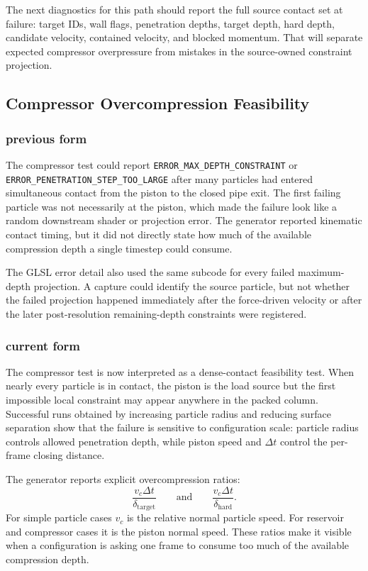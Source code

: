 The next diagnostics for this path should report the full source contact set
at failure: target IDs, wall flags, penetration depths, target depth, hard
depth, candidate velocity, contained velocity, and blocked momentum.  That
will separate expected compressor overpressure from mistakes in the
source-owned constraint projection.

\subsection{Compressor Overcompression Feasibility}

\subsubsection{previous form}

The compressor test could report
\texttt{ERROR\_MAX\_DEPTH\_CONSTRAINT} or
\texttt{ERROR\_PENETRATION\_STEP\_TOO\_LARGE} after many particles had
entered simultaneous contact from the piston to the closed pipe exit.  The
first failing particle was not necessarily at the piston, which made the
failure look like a random downstream shader or projection error.  The
generator reported kinematic contact timing, but it did not directly state
how much of the available compression depth a single timestep could consume.

The GLSL error detail also used the same subcode for every failed
maximum-depth projection.  A capture could identify the source particle, but
not whether the failed projection happened immediately after the force-driven
velocity or after the later post-resolution remaining-depth constraints were
registered.

\subsubsection{current form}

The compressor test is now interpreted as a dense-contact feasibility test.
When nearly every particle is in contact, the piston is the load source but
the first impossible local constraint may appear anywhere in the packed
column.  Successful runs obtained by increasing particle radius and reducing
surface separation show that the failure is sensitive to configuration scale:
particle radius controls allowed penetration depth, while piston speed and
\(\Delta t\) control the per-frame closing distance.

The generator reports explicit overcompression ratios:
\[
    \frac{v_c\Delta t}{\delta_{\mathrm{target}}}
    \qquad\mathrm{and}\qquad
    \frac{v_c\Delta t}{\delta_{\mathrm{hard}}}.
\]
For simple particle cases \(v_c\) is the relative normal particle speed.  For
reservoir and compressor cases it is the piston normal speed.  These ratios
make it visible when a configuration is asking one frame to consume too much
of the available compression depth.

